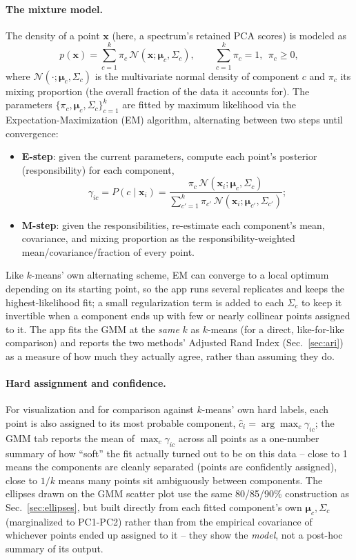 \documentclass[11pt,a4paper]{article}
\begin{document}
\paragraph{The mixture model.} The density of a point $\mathbf{x}$ (here, a
spectrum's retained PCA scores) is modeled as
\[
  p(\mathbf{x}) = \sum_{c=1}^k \pi_c\, \mathcal{N}(\mathbf{x};
  \boldsymbol\mu_c, \Sigma_c) ,
  \qquad \sum_{c=1}^k \pi_c = 1,\ \ \pi_c \ge 0 ,
\]
where $\mathcal{N}(\cdot;\boldsymbol\mu_c,\Sigma_c)$ is the multivariate
normal density of component $c$ and $\pi_c$ its mixing proportion (the
overall fraction of the data it accounts for). The parameters
$\{\pi_c,\boldsymbol\mu_c,\Sigma_c\}_{c=1}^k$ are fitted by maximum
likelihood via the Expectation-Maximization (EM) algorithm, alternating
between two steps until convergence:
\begin{itemize}[nosep]
  \item \textbf{E-step}: given the current parameters, compute each
  point's posterior (responsibility) for each component,
  \[
    \gamma_{ic} = P(c \mid \mathbf{x}_i) =
    \frac{\pi_c\, \mathcal{N}(\mathbf{x}_i;\boldsymbol\mu_c,\Sigma_c)}
         {\sum_{c'=1}^k \pi_{c'}\, \mathcal{N}(\mathbf{x}_i;\boldsymbol\mu_{c'},\Sigma_{c'})} ;
  \]
  \item \textbf{M-step}: given the responsibilities, re-estimate each
  component's mean, covariance, and mixing proportion as the
  responsibility-weighted mean/covariance/fraction of every point.
\end{itemize}
Like $k$-means' own alternating scheme, EM can converge to a local optimum
depending on its starting point, so the app runs several replicates and
keeps the highest-likelihood fit; a small regularization term is added to
each $\Sigma_c$ to keep it invertible when a component ends up with few or
nearly collinear points assigned to it. The app fits the GMM at the
\emph{same} $k$ as $k$-means (for a direct, like-for-like comparison) and
reports the two methods' Adjusted Rand Index (Sec.~\ref{sec:ari}) as a
measure of how much they actually agree, rather than assuming they do.

\paragraph{Hard assignment and confidence.} For visualization and for
comparison against $k$-means' own hard labels, each point is also assigned
to its most probable component, $\hat c_i = \arg\max_c \gamma_{ic}$; the
GMM tab reports the mean of $\max_c \gamma_{ic}$ across all points as a
one-number summary of how ``soft'' the fit actually turned out to be on
this data -- close to 1 means the components are cleanly separated (points
are confidently assigned), close to $1/k$ means many points sit
ambiguously between components. The ellipses drawn on the GMM scatter plot
use the same 80/85/90\% construction as Sec.~\ref{sec:ellipses}, but built
directly from each fitted component's own $\boldsymbol\mu_c,\Sigma_c$
(marginalized to PC1-PC2) rather than from the empirical covariance of
whichever points ended up assigned to it -- they show the \emph{model},
not a post-hoc summary of its output.
\end{document}
